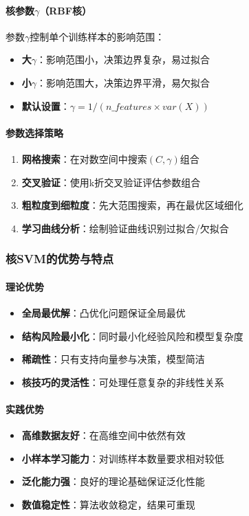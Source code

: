 \documentclass[UTF8]{report}
\theoremstyle{MyLineTheoremStyle} %
\theoremstyle{MyBlockTheoremStyle} %
\theoremstyle{MySubsubsectionStyle} %
\begin{document}
\paragraph{核参数$\gamma$（RBF核）}
参数$\gamma$控制单个训练样本的影响范围：
\begin{itemize}
    \item \textbf{大$\gamma$}：影响范围小，决策边界复杂，易过拟合
    \item \textbf{小$\gamma$}：影响范围大，决策边界平滑，易欠拟合
    \item \textbf{默认设置}：$\gamma = 1/(n\_features \times var(X))$
\end{itemize}

\paragraph{参数选择策略}
\begin{enumerate}[label=\arabic*.]
    \item \textbf{网格搜索}：在对数空间中搜索$(C, \gamma)$组合
    \item \textbf{交叉验证}：使用k折交叉验证评估参数组合
    \item \textbf{粗粒度到细粒度}：先大范围搜索，再在最优区域细化
    \item \textbf{学习曲线分析}：绘制验证曲线识别过拟合/欠拟合
\end{enumerate}

\subsubsection{核SVM的优势与特点}

\paragraph{理论优势}
\begin{itemize}
    \item \textbf{全局最优解}：凸优化问题保证全局最优
    \item \textbf{结构风险最小化}：同时最小化经验风险和模型复杂度
    \item \textbf{稀疏性}：只有支持向量参与决策，模型简洁
    \item \textbf{核技巧的灵活性}：可处理任意复杂的非线性关系
\end{itemize}

\paragraph{实践优势}
\begin{itemize}
    \item \textbf{高维数据友好}：在高维空间中依然有效
    \item \textbf{小样本学习能力}：对训练样本数量要求相对较低
    \item \textbf{泛化能力强}：良好的理论基础保证泛化性能
    \item \textbf{数值稳定性}：算法收敛稳定，结果可重现
\end{itemize}
\end{document}
